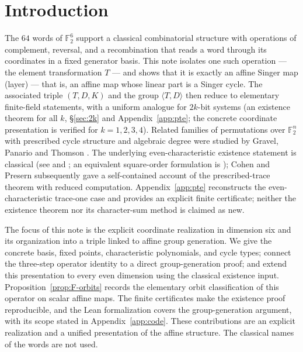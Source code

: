 \documentclass[11pt]{article}
\begin{document}
\section{Introduction}\label{sec:intro}
The $64$ words of $\mathbb{F}_2^6$ support a classical combinatorial structure with
operations of complement, reversal, and a recombination that reads a word through its
coordinates in a fixed generator basis. This note isolates one such operation --- the
element transformation $T$ --- and shows that it is exactly an affine Singer map (layer) --- that is, an affine map whose
linear part is a Singer cycle. The
associated triple $(T,D,K)$ and the group $\langle T,D\rangle$ then reduce to
elementary finite-field statements, with a uniform analogue for $2k$-bit systems
(an existence theorem for all $k$, \S\ref{sec:2k} and Appendix~\ref{app:pte}; the concrete coordinate presentation is verified for $k=1,2,3,4$). Related families of
permutations over $\mathbb{F}_2^n$ with prescribed cycle structure and algebraic
degree were studied by Gravel, Panario and Thomson \cite{GPT}. The underlying
even-characteristic existence statement is classical (see \cite{Mor} and
\cite[Theorem~1, p.~1]{Coh90}; an equivalent square-order formulation is \cite[Theorem~1.5, p.~170]{Coh});
Cohen and Presern \cite{CP05} subsequently gave a self-contained account of
the prescribed-trace theorem with reduced computation.
Appendix~\ref{app:pte} reconstructs the even-characteristic trace-one case and
provides an explicit finite certificate; neither the existence theorem nor its
character-sum method is claimed as new.

The focus of this note is the explicit coordinate realization in dimension six
and its organization into a triple linked to affine group generation. We give
the concrete basis, fixed points, characteristic polynomials, and cycle types;
connect the three-step operator identity to a direct group-generation proof;
and extend this presentation to every even dimension using the classical
existence input. Proposition~\ref{prop:F-orbits} records the elementary orbit
classification of this operator on scalar affine maps. The finite certificates
make the existence proof reproducible, and the Lean formalization covers the
group-generation argument, with its scope stated in Appendix~\ref{app:code}.
These contributions are an explicit realization and a unified presentation of
the affine structure. The classical names of the words are not used.
\end{document}
